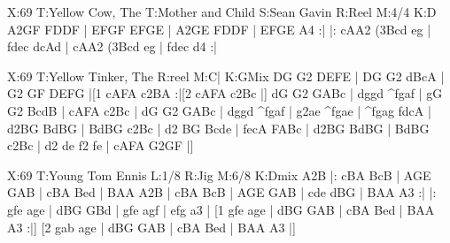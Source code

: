 \documentclass{article}
\begin{document}
\begin{abc}[name]
X:69
T:Yellow Cow, The
T:Mother and Child
S:Sean Gavin
R:Reel
M:4/4
K:D
A2GF FDDF | EFGF EFGE | A2GE FDDF | EFGE A4 :|
|: cAA2 (3Bcd eg | fdec dcAd | cAA2 (3Bcd eg | fdec d4 :|
\end{abc}

\begin{abc}[name]
X:69
T:Yellow Tinker, The
R:reel
M:C|
K:GMix
DG G2 DEFE | DG G2 dBcA | G2 GF DEFG |[1 cAFA c2BA :|[2 cAFA c2Bc |]
dG G2 GABc | dggd ^fgaf | gG G2 BcdB | cAFA c2Bc |
dG G2 GABc | dggd ^fgaf | g2ae ^fgae | ^fgag fdcA |
d2BG BdBG | BdBG c2Bc | d2 BG Bcde | fecA FABc |
d2BG BdBG | BdBG c2Bc | d2 de f2 fe | cAFA G2GF |]
\end{abc}

\begin{abc}[name]
X:69
T:Young Tom Ennis
L:1/8
R:Jig
M:6/8
K:Dmix
A2B |: cBA BcB | AGE GAB | cBA Bed | BAA A2B |
cBA BcB | AGE GAB | cde dBG | BAA A3 :|
|: gfe age | dBG GBd | gfe agf | efg a3 |
[1 gfe age | dBG GAB | cBA Bed | BAA A3 :|]
[2 gab age | dBG GAB | cBA Bed | BAA A3 |]
\end{abc}
\end{document}
